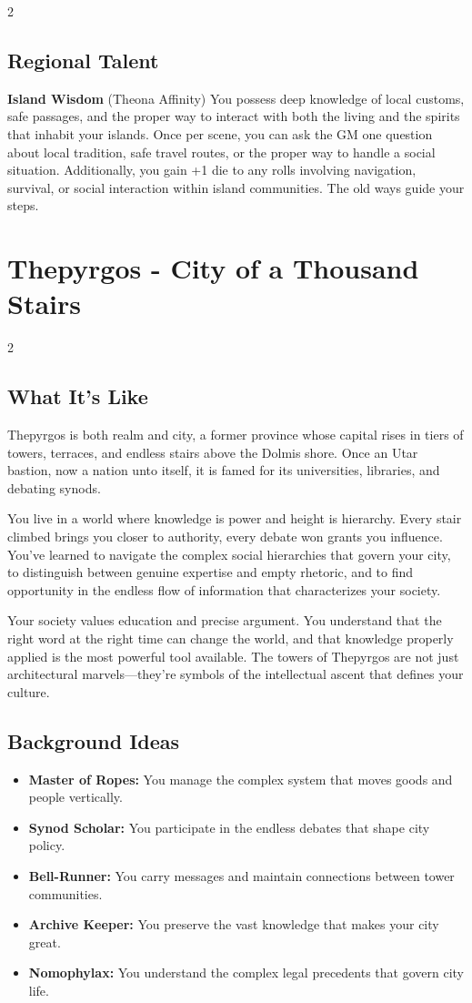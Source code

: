 \documentclass[11pt]{article}
\newcommand{\region}[1]{\section*{#1}}
\newcommand{\subregion}[1]{\subsection*{#1}}
\begin{document}
\begin{multicols}{2}
\subregion{Regional Talent}

\textbf{Island Wisdom} (Theona Affinity)
You possess deep knowledge of local customs, safe passages, and the proper way to interact with both the living and the spirits that inhabit your islands. Once per scene, you can ask the GM one question about local tradition, safe travel routes, or the proper way to handle a social situation. Additionally, you gain +1 die to any rolls involving navigation, survival, or social interaction within island communities. The old ways guide your steps.

\end{multicols}

\region{Thepyrgos - City of a Thousand Stairs}

\begin{multicols}{2}
\subregion{What It's Like}

Thepyrgos is both realm and city, a former province whose capital rises in tiers of towers, terraces, and endless stairs above the Dolmis shore. Once an Utar bastion, now a nation unto itself, it is famed for its universities, libraries, and debating synods.

You live in a world where knowledge is power and height is hierarchy. Every stair climbed brings you closer to authority, every debate won grants you influence. You've learned to navigate the complex social hierarchies that govern your city, to distinguish between genuine expertise and empty rhetoric, and to find opportunity in the endless flow of information that characterizes your society.

Your society values education and precise argument. You understand that the right word at the right time can change the world, and that knowledge properly applied is the most powerful tool available. The towers of Thepyrgos are not just architectural marvels---they're symbols of the intellectual ascent that defines your culture.

\columnbreak

\subregion{Background Ideas}

\begin{itemize}[leftmargin=*]
    \item \textbf{Master of Ropes:} You manage the complex system that moves goods and people vertically.
    \item \textbf{Synod Scholar:} You participate in the endless debates that shape city policy.
    \item \textbf{Bell-Runner:} You carry messages and maintain connections between tower communities.
    \item \textbf{Archive Keeper:} You preserve the vast knowledge that makes your city great.
    \item \textbf{Nomophylax:} You understand the complex legal precedents that govern city life.
\end{itemize}


\end{multicols}
\end{document}
